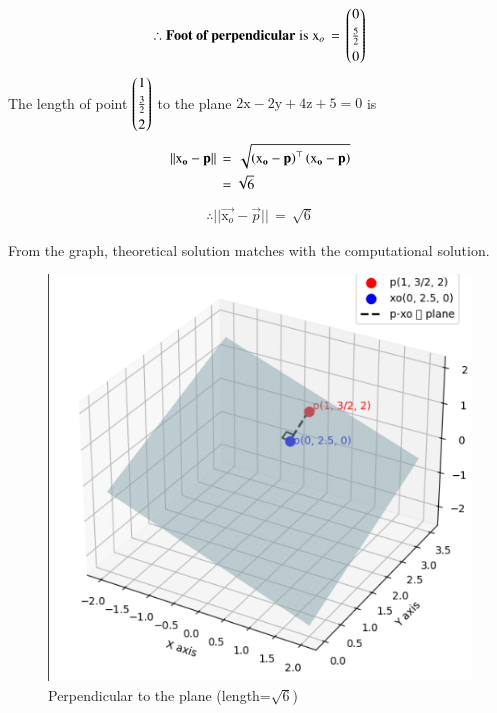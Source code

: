 \documentclass[journal,12pt,onecolumn]{IEEEtran}
\theoremstyle{remark}
\begin{document}
\begin{align*}
    \therefore \textbf{Foot of perpendicular}\; \text{is}\; \mathbf{\text{x}}_o\,=\,\begin{pmatrix}0\\[3pt]\frac{5}{2}\\[3pt]0\end{pmatrix}
    \end{align*}
\newpage
The length of point $\begin{pmatrix}1\\[3pt]\frac{3}{2}\\[3pt]2\end{pmatrix}$ to the plane $2\text{x}-2\text{y}+4\text{z}+5=0$ is
\begin{align}
    ||\mathbf{\text{x}_o}-\mathbf{p}||\,&=\,\sqrt{\left(\mathbf{\text{x}_o}-\mathbf{p}\right)^\top\left(\mathbf{\text{x}_o}-\mathbf{p}\right)}\\
    &=\sqrt{6}
\end{align}
\begin{align*}
    \therefore ||\vec{\text{x}_o}-\vec{p}||\,=\,\sqrt{6}
\end{align*}

From the graph, theoretical solution matches with the computational solution.

\begin{figure}[H]
\centering
\includegraphics[width=0.7\columnwidth]{figs/graph.png}
\caption*{Perpendicular to the plane (length=$\sqrt{6}$)}
\label{fig:graph.png}
\end{figure}
\end{document}

